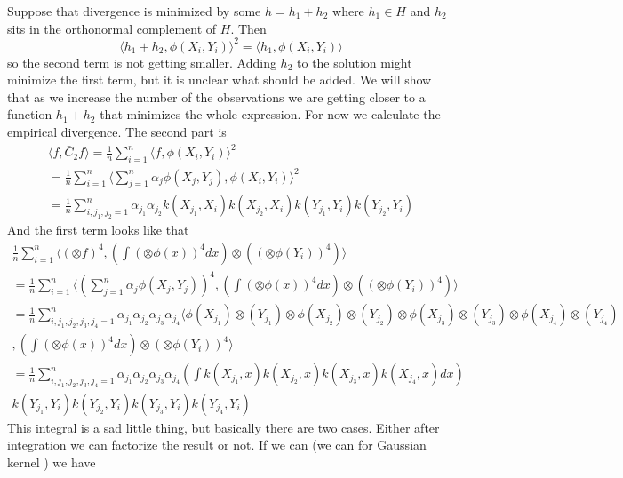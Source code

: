 \documentclass[10pt]{article}
\begin{document}
Suppose that divergence is minimized by some $h = h_1 + h_2$ where $h_1 \in H$ and $h_2$ sits in the orthonormal complement of $H$. Then 
\begin{equation}
 \langle h_1 + h_2 , \phi(X_i,Y_i) \rangle^2 =\langle h_1 , \phi(X_i,Y_i) \rangle
\end{equation}
so the second term is not getting smaller. Adding $h_2$ to the solution might minimize the first term, but it is unclear what should be added. We will show that as we increase the number of the observations we are getting closer to a function $h_1 + h_2$ that minimizes the whole expression.
For now we calculate the empirical divergence. The second part is
\begin{align}
  \langle f, \bar C_2 f \rangle = \frac 1 n \sum_{i=1}^n \langle f , \phi(X_i,Y_i) \rangle^2 \\
  = \frac 1 n \sum_{i=1}^n \langle \sum_{j=1}^{n} \alpha_j \phi(X_j,Y_j) , \phi(X_i,Y_i) \rangle^2 \\
   = \frac 1 n \sum_{i,j_1,j_2=1}^n \alpha_{j_1} \alpha_{j_2} k(X_{j_1},X_i) k(X_{j_2},X_i)  k(Y_{j_1},Y_i) k(Y_{j_2},Y_i) 
\end{align}
And the first term looks like that 
\begin{align}
  \frac 1 n \sum_{i=1}^n \langle  (\otimes f)^4  ,  \left( \int  (\otimes \phi(x))^4 dx  \right)  \otimes \left(    (\otimes \phi(Y_{i}))^4 \right) \rangle \\
  = \frac 1 n \sum_{i=1}^n \langle  ( \sum_{j=1}^{n} \alpha_j \phi(X_j,Y_j))^4  ,  \left( \int  (\otimes \phi(x))^4 dx  \right)  \otimes \left(    (\otimes \phi(Y_{i}))^4 \right) \rangle \\
  =\frac 1 n \sum_{i,j_1,j_2,j_3,j_4=1}^n  \alpha_{j_1} \alpha_{j_2} \alpha_{j_3} \alpha_{j_4} \langle \phi(X_{j_1}) \otimes (Y_{j_1}) \otimes  \phi(X_{j_2}) \otimes (Y_{j_2}) \otimes  \phi(X_{j_3}) \otimes (Y_{j_3}) \otimes  \phi(X_{j_4}) \otimes (Y_{j_4})\\
  ,\left( \int  (\otimes \phi(x))^4 dx  \right)  \otimes \left(    \otimes \phi(Y_{i}) \right)^4 \rangle \\
  =\frac 1 n \sum_{i,j_1,j_2,j_3,j_4=1}^n  \alpha_{j_1} \alpha_{j_2} \alpha_{j_3} \alpha_{j_4} \left( \int k(X_{j_1},x) k(X_{j_2},x) k(X_{j_3},x) k(X_{j_4},x)  dx \right) \\ 
    k(Y_{j_1},Y_i) k(Y_{j_2},Y_i)k(Y_{j_3},Y_i)k(Y_{j_4},Y_i)
\end{align}
This integral is a sad little thing, but basically there are two cases. Either after integration we can factorize the result or not. If we can (we can for Gaussian kernel ) we have  
\end{document}
